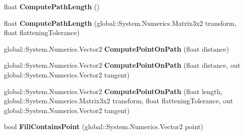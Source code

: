 \begin{DoxyCompactItemize}
\mbox{\label{interface_microsoft_1_1_graphics_1_1_canvas_1_1_geometry_1_1_i_canvas_geometry_a7b9a9d62779c0ffb9edae6b37d603e83}} 
float {\bfseries Compute\+Path\+Length} ()
\item 
\mbox{\label{interface_microsoft_1_1_graphics_1_1_canvas_1_1_geometry_1_1_i_canvas_geometry_a86d3efebb758fbccdb757cae6bd3be83}} 
float {\bfseries Compute\+Path\+Length} (global\+::\+System.\+Numerics.\+Matrix3x2 transform, float flattening\+Tolerance)
\item 
\mbox{\label{interface_microsoft_1_1_graphics_1_1_canvas_1_1_geometry_1_1_i_canvas_geometry_a8d6d3c32929175715f13de9f723e337c}} 
global\+::\+System.\+Numerics.\+Vector2 {\bfseries Compute\+Point\+On\+Path} (float distance)
\item 
\mbox{\label{interface_microsoft_1_1_graphics_1_1_canvas_1_1_geometry_1_1_i_canvas_geometry_a294f3ceb3a3cc6a0a96a5a902d21cb7a}} 
global\+::\+System.\+Numerics.\+Vector2 {\bfseries Compute\+Point\+On\+Path} (float distance, out global\+::\+System.\+Numerics.\+Vector2 tangent)
\item 
\mbox{\label{interface_microsoft_1_1_graphics_1_1_canvas_1_1_geometry_1_1_i_canvas_geometry_ad81c3e0d8ae57428fe171ea8ae3cf362}} 
global\+::\+System.\+Numerics.\+Vector2 {\bfseries Compute\+Point\+On\+Path} (float length, global\+::\+System.\+Numerics.\+Matrix3x2 transform, float flattening\+Tolerance, out global\+::\+System.\+Numerics.\+Vector2 tangent)
\item 
\mbox{\label{interface_microsoft_1_1_graphics_1_1_canvas_1_1_geometry_1_1_i_canvas_geometry_ab005a35192b8530d5130afda195edc90}} 
bool {\bfseries Fill\+Contains\+Point} (global\+::\+System.\+Numerics.\+Vector2 point)
\item 
\mbox{\label{interface_microsoft_1_1_graphics_1_1_canvas_1_1_geometry_1_1_i_canvas_geometry_a3f57176b32e683124f11427fcc2c81d7}} 

\end{DoxyCompactItemize}
